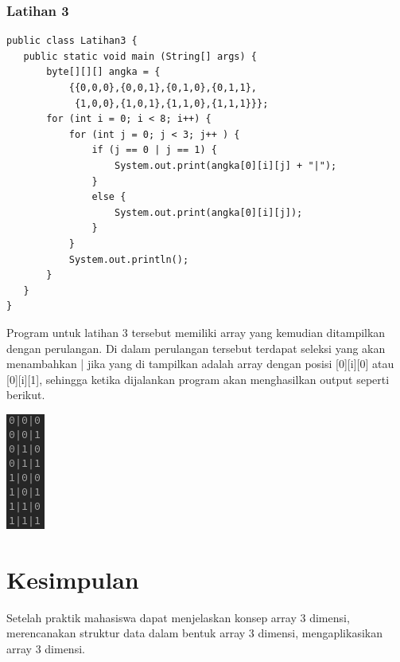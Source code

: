 \documentclass[a4paper,12pt]{article}
\begin{document}
\subsubsection{Latihan 3}
\begin{lstlisting}
public class Latihan3 {
   public static void main (String[] args) {
       byte[][][] angka = {
           {{0,0,0},{0,0,1},{0,1,0},{0,1,1},
            {1,0,0},{1,0,1},{1,1,0},{1,1,1}}};
       for (int i = 0; i < 8; i++) {
           for (int j = 0; j < 3; j++ ) {
               if (j == 0 | j == 1) {
                   System.out.print(angka[0][i][j] + "|");
               }
               else {
                   System.out.print(angka[0][i][j]);
               }
           }
           System.out.println();
       }
   }
}
\end{lstlisting}
Program untuk latihan 3 tersebut memiliki array yang kemudian ditampilkan dengan perulangan. Di dalam perulangan tersebut terdapat seleksi yang akan menambahkan
| jika yang di tampilkan adalah array dengan posisi [0][i][0] atau [0][i][1], sehingga ketika dijalankan program akan menghasilkan output seperti berikut.
\begin{center}
    \includegraphics[scale=.8]{6.png}
\end{center}

\newpage

\section{Kesimpulan}
Setelah praktik mahasiswa dapat menjelaskan konsep array 3 dimensi, merencanakan struktur data dalam bentuk array 3 dimensi, mengaplikasikan array 3 dimensi.
\end{document}
